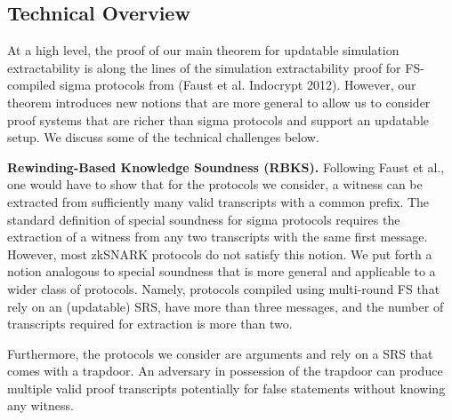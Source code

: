 \documentclass[11pt]{llncs}
\newcommand{\oursubsub}[1] {\smallskip\noindent\textbf{#1}}
\begin{document}
\subsection{Technical Overview}
At a high level, the proof of our main theorem for updatable simulation
extractability is along the lines of the simulation extractability proof for
FS-compiled sigma protocols from (Faust et al. Indocrypt 2012). However, our theorem
introduces new notions that are more general to allow us to consider proof
systems that are richer than sigma protocols and support an updatable setup. We
discuss some of the technical challenges below.

\oursubsub{Rewinding-Based Knowledge Soundness (RBKS).}
Following Faust et al., one would have to show that for the protocols
we consider, a witness can be extracted from sufficiently many valid transcripts
with a common prefix. The standard definition of special soundness for sigma
protocols requires the extraction of a witness from any two transcripts with the
same first message. However, most zkSNARK protocols do not satisfy this notion.
We put forth a notion analogous to special soundness that is more general and
applicable to a wider class of protocols. Namely, protocols compiled using multi-round FS that rely on an (updatable) SRS,  have more than three messages, and the number of transcripts required for extraction is more than two. 

Furthermore, the protocols we consider are arguments and rely on a SRS that comes with a trapdoor. An adversary in possession of the trapdoor can produce multiple valid proof transcripts potentially for false statements without
knowing any witness. 

\end{document}
